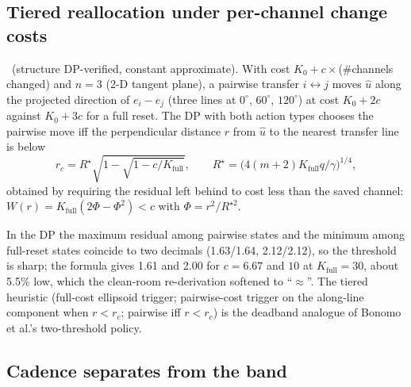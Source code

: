 \subsection{Tiered reallocation under per-channel change costs}
\label{deadband:sec:tier}

\begin{proposition}
\label{deadband:prop:tier}
\tagNumerical\ (structure DP-verified, constant approximate). With cost $K_0 + c\times$(\#channels changed) and $n = 3$ (2-D tangent plane), a pairwise transfer $i \leftrightarrow j$ moves $\hat u$ along the projected direction of $e_i - e_j$ (three lines at $0^\circ$, $60^\circ$, $120^\circ$) at cost $K_0 + 2c$ against $K_0 + 3c$ for a full reset. The DP with both action types chooses the pairwise move iff the perpendicular distance $r$ from $\hat u$ to the nearest transfer line is below
\begin{equation}
r_c = R^\star\sqrt{1 - \sqrt{1 - c/K_{\mathrm{full}}}}, \qquad R^\star = \big(4(m+2)K_{\mathrm{full}}q/\gamma\big)^{1/4},
\label{eq:deadband:rc}
\end{equation}
obtained by requiring the residual left behind to cost less than the saved channel: $W(r) = K_{\mathrm{full}}(2\Phi - \Phi^2) < c$ with $\Phi = r^2/R^{\star2}$.
\end{proposition}

In the DP the maximum residual among pairwise states and the minimum among full-reset states coincide to two decimals (1.63/1.64, 2.12/2.12), so the threshold is sharp; the formula gives 1.61 and 2.00 for $c = 6.67$ and $10$ at $K_{\mathrm{full}} = 30$, about 5.5\% low, which the clean-room re-derivation softened to ``$\approx$''. The tiered heuristic (full-cost ellipsoid trigger; pairwise-cost trigger on the along-line component when $r < r_c$; pairwise iff $r < r_c$) is the deadband analogue of Bonomo et al.'s two-threshold policy.

\subsection{Cadence separates from the band}

